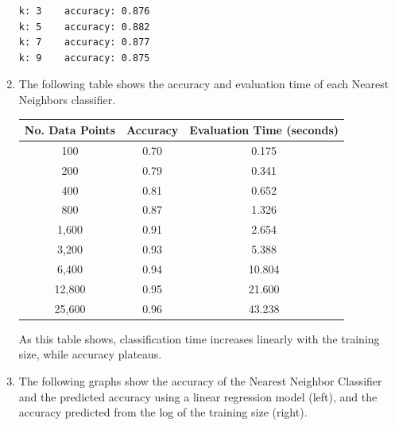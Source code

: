 \documentclass{article}
\begin{document}
\begin{enumerate}[start=1]
\begin{Verbatim}[commandchars=+\[\]]
k: 3	accuracy: 0.876
k: 5	accuracy: 0.882
k: 7	accuracy: 0.877
k: 9	accuracy: 0.875
    \end{Verbatim}
    
\newpage

\item %
    The following table shows the accuracy and evaluation time of each Nearest Neighbors classifier.
    
    \begin{tabular}{| c | c | c |}
    \hline
    \textbf{No. Data Points} & \textbf{Accuracy} & \textbf{Evaluation Time (seconds)} \\
    \hline
    100 & 0.70 & 0.175 \\
    \hline
    200 & 0.79 & 0.341 \\
    \hline
    400 & 0.81 & 0.652 \\
    \hline
    800 & 0.87 & 1.326 \\
    \hline
    1,600 & 0.91 & 2.654 \\
    \hline
    3,200 & 0.93 & 5.388 \\
    \hline
    6,400 & 0.94 & 10.804 \\
    \hline
    12,800 & 0.95 & 21.600 \\
    \hline
    25,600 & 0.96 & 43.238 \\
    \hline
    \end{tabular}
    
    As this table shows, classification time increases linearly with the training size, while accuracy plateaus.
    
\item %
    The following graphs show the accuracy of the Nearest Neighbor Classifier and the predicted accuracy using a linear regression model (left), and the accuracy predicted from the log of the training size (right).
    

\end{enumerate}
\end{document}
